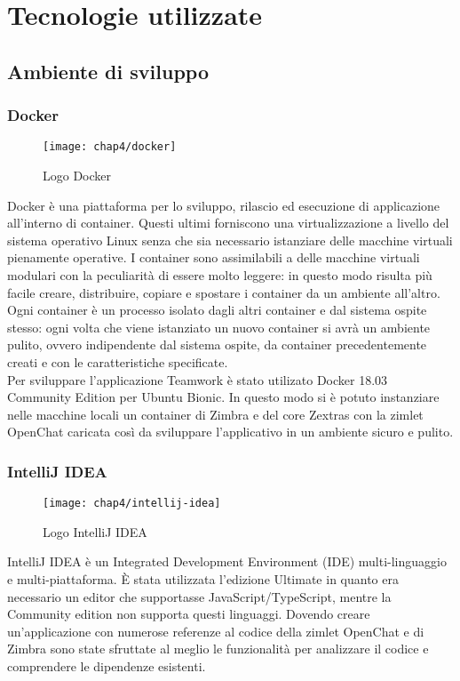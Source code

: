 
\chapter{Tecnologie utilizzate}\label{chap:tec}
\section{Ambiente di sviluppo}
\subsection{Docker}
	\begin{figure}[H] 
		\centering
		\texttt{[image: chap4/docker]}
		\caption{Logo Docker}
	\end{figure}
Docker è una piattaforma per lo sviluppo, rilascio ed esecuzione di applicazione 
all'interno di container. Questi ultimi forniscono una virtualizzazione a livello 
del sistema operativo Linux senza che sia necessario istanziare delle macchine 
virtuali pienamente operative.
I container sono assimilabili a delle macchine virtuali modulari con la peculiarità 
di essere molto leggere: in questo modo risulta più facile creare, distribuire, 
copiare e spostare i container da un ambiente all'altro.
Ogni container è un processo isolato dagli altri container e dal sistema ospite 
stesso:  ogni volta che viene istanziato un nuovo container si avrà un ambiente 
pulito, ovvero indipendente dal sistema ospite, da container precedentemente 
creati e con le caratteristiche specificate. \\
Per sviluppare l'applicazione Teamwork è stato utilizato Docker 18.03 Community 
Edition per Ubuntu Bionic. In questo modo si è potuto instanziare nelle macchine 
locali un container di Zimbra e del core Zextras con la zimlet OpenChat caricata 
così da sviluppare l'applicativo in un ambiente sicuro e pulito.

\subsection{IntelliJ IDEA} \label{subsec:IntelliJ}
	\begin{figure}[H] 
		\centering
		\texttt{[image: chap4/intellij-idea]}
		\caption{Logo IntelliJ IDEA}
	\end{figure}
IntelliJ IDEA è un Integrated Development Environment (IDE) multi-linguaggio e 
multi-piattaforma. 
È stata utilizzata l'edizione Ultimate in quanto era necessario un editor che 
supportasse JavaScript/TypeScript, mentre la Community edition non supporta 
questi linguaggi. 
Dovendo creare un'applicazione con numerose referenze al codice della zimlet 
OpenChat e di Zimbra sono state sfruttate al meglio le funzionalità per 
analizzare il codice e comprendere le dipendenze esistenti.

